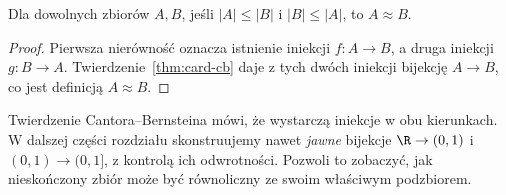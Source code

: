 \begin{wniosek}\label{cor:card-antisym}
Dla dowolnych zbiorów $A,B$, jeśli
$|A|\le |B|$ i $|B|\le |A|$,
to $A\approx B$.
\end{wniosek}
\begin{proof}
Pierwsza nierówność oznacza istnienie
iniekcji $f:A\to B$, a druga
iniekcji $g:B\to A$.
Twierdzenie~\ref{thm:card-cb}
daje z tych dwóch iniekcji bijekcję $A\to B$,
co jest definicją $A\approx B$.
\end{proof}
\begin{uwaga}
Twierdzenie Cantora--Bernsteina mówi, że wystarczą iniekcje w obu kierunkach.
W dalszej części rozdziału skonstruujemy nawet \emph{jawne} bijekcje
$\R\to(0,1)$ i $(0,1)\to(0,1]$, z kontrolą ich odwrotności.
Pozwoli to zobaczyć, jak nieskończony zbiór może być równoliczny
ze swoim właściwym podzbiorem.
\end{uwaga}

